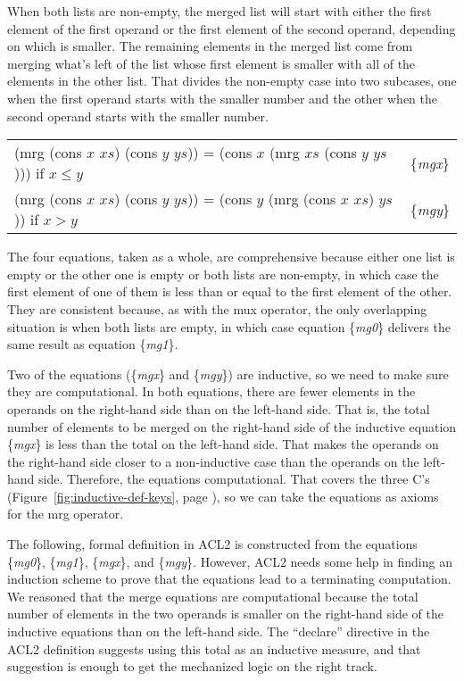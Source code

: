 When both lists are non-empty, the merged list will
start with either the first element of the first operand
or the first element of the second operand,
depending on which is smaller.
The remaining elements in the merged list come from
merging what's left of the list whose first element is smaller
with all of the elements in the other list.
That divides the non-empty case into two
subcases, one when the first operand starts with the smaller number
and the other when the second operand starts with the smaller number.

\begin{center}
\begin{tabular}{ll}
(mrg (cons $x$ $xs$) (cons $y$ $ys$)) = (cons $x$ (mrg $xs$ (cons $y$ $ys$))) if $x \le y$ & \{\emph{mgx}\} \\
(mrg (cons $x$ $xs$) (cons $y$ $ys$)) = (cons $y$ (mrg (cons $x$ $xs$) $ys$)) if $x > y$   & \{\emph{mgy}\} \\
\end{tabular}
\end{center}

The four equations, taken as a whole, are comprehensive
because either one list is empty or the other one is empty
or both lists are non-empty,
in which case the first element of one of them
is less than or equal to the first element of the other.
They are consistent because, as with the mux operator,
the only overlapping situation is when
both lists are empty, in which case equation \{\emph{mg0}\}
delivers the same result as equation \{\emph{mg1}\}.

Two of the equations (\{\emph{mgx}\} and \{\emph{mgy}\}) are inductive,
so we need to make sure they are computational.
In both equations, there are fewer elements in the operands
on the right-hand side than on the left-hand side.
That is, the total number of elements to be merged
on the right-hand side of the inductive equation \{\emph{mgx}\}
is less than the total on the left-hand side.
That makes the operands on the right-hand side closer to
a non-inductive case than the operands on the left-hand side.
Therefore, the equations computational.
That covers the three C's
(Figure~\ref{fig:inductive-def-keys}, page \pageref{fig:inductive-def-keys}),
so we can take the equations as axioms for the mrg operator.

The following, formal definition in ACL2 is constructed from
the equations \{\emph{mg0}\}, \{\emph{mg1}\}, \{\emph{mgx}\}, and \{\emph{mgy}\}.
However, ACL2 needs some help in finding an induction scheme
to prove that the equations lead to a terminating computation.
We reasoned that the merge equations are computational
because the total number of elements in the two operands
is smaller on the right-hand side of the inductive equations
than on the left-hand side.
The ``declare'' directive in the ACL2 definition suggests using
this total as an inductive measure,
and that suggestion is enough to get the mechanized logic on the right track.


